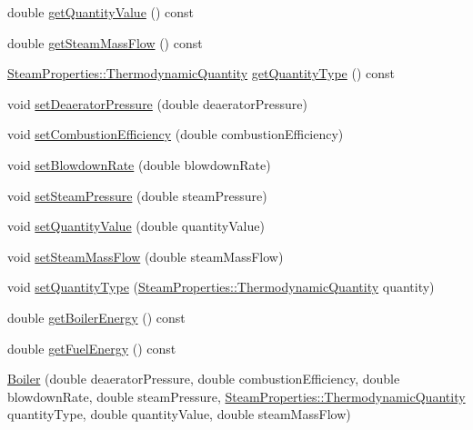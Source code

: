 \begin{DoxyCompactItemize}
\item 
double \hyperlink{class_boiler_a78370a174135e6cc95abcd3b7ac2f947}{get\+Quantity\+Value} () const
\item 
double \hyperlink{class_boiler_a4101e71234995558a451dcab145b5fc9}{get\+Steam\+Mass\+Flow} () const
\item 
\hyperlink{class_steam_properties_ae0294bedf7d178c2d8fb6aed0f62fbff}{Steam\+Properties\+::\+Thermodynamic\+Quantity} \hyperlink{class_boiler_a26a71f789c9f9e05bd43a1ca0219f920}{get\+Quantity\+Type} () const
\item 
void \hyperlink{class_boiler_a56f422254606ebba1248ae0b4f8f0215}{set\+Deaerator\+Pressure} (double deaerator\+Pressure)
\item 
void \hyperlink{class_boiler_abef6bc48101f98f0650cb07fb1d51f74}{set\+Combustion\+Efficiency} (double combustion\+Efficiency)
\item 
void \hyperlink{class_boiler_a66c0e4c577dbd3f52dcf202e69a08371}{set\+Blowdown\+Rate} (double blowdown\+Rate)
\item 
void \hyperlink{class_boiler_a0a4619ff73c9969daebe3aa66ddad6be}{set\+Steam\+Pressure} (double steam\+Pressure)
\item 
void \hyperlink{class_boiler_ac3450d88dba124529d59baf62c39e14a}{set\+Quantity\+Value} (double quantity\+Value)
\item 
void \hyperlink{class_boiler_ada7af5896a2a4701d78a532dc9bc9892}{set\+Steam\+Mass\+Flow} (double steam\+Mass\+Flow)
\item 
void \hyperlink{class_boiler_a9c5b20cae6133c9174b12760f36d52c2}{set\+Quantity\+Type} (\hyperlink{class_steam_properties_ae0294bedf7d178c2d8fb6aed0f62fbff}{Steam\+Properties\+::\+Thermodynamic\+Quantity} quantity)
\item 
double \hyperlink{class_boiler_a8cc9ad5f1b36f5dcbcb225e9e3d13a39}{get\+Boiler\+Energy} () const
\item 
double \hyperlink{class_boiler_a55542a761669c842163b20932f9747d3}{get\+Fuel\+Energy} () const
\item 
\hyperlink{class_boiler_adebe1dca06edc8dbca462e226b4dd9d5}{Boiler} (double deaerator\+Pressure, double combustion\+Efficiency, double blowdown\+Rate, double steam\+Pressure, \hyperlink{class_steam_properties_ae0294bedf7d178c2d8fb6aed0f62fbff}{Steam\+Properties\+::\+Thermodynamic\+Quantity} quantity\+Type, double quantity\+Value, double steam\+Mass\+Flow)
\item 
\mbox{\label{class_boiler_a47e660b470ef7c2749102ae6873922e1}} 

\end{DoxyCompactItemize}
